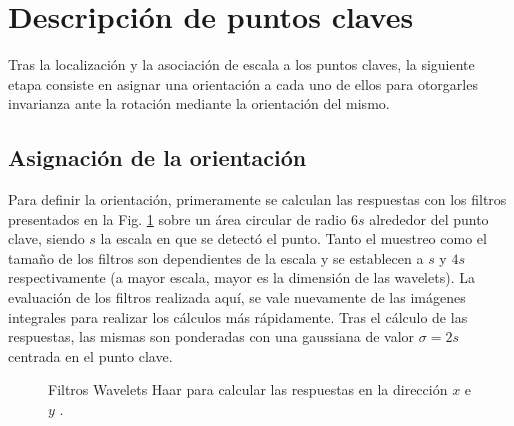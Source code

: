 \section{Descripción de puntos claves}
    \label{sec:descripcion_ptos_claves}
    Tras la localización y la asociación de escala a los puntos claves, la siguiente etapa consiste en asignar una orientación a cada uno de ellos para otorgarles invarianza ante la rotación mediante la orientación del mismo.
%   
  \subsection{Asignación de la orientación}
    \label{sec:orientacion_del_punto}
     Para definir la orientación, primeramente se calculan las respuestas con los filtros presentados en la Fig. \ref{fig:simplekernels} sobre un área circular de radio $6s$ alrededor del punto clave, siendo $s$ la escala en que se detectó el punto. Tanto el muestreo como el tamaño de los filtros son dependientes de la escala y se establecen a $s$ y $4s$ respectivamente (a mayor escala, mayor es la dimensión de las wavelets). %
    La evaluación de los filtros realizada aquí, se vale nuevamente de las imágenes integrales para realizar los cálculos más rápidamente. Tras el cálculo de las respuestas, las mismas son ponderadas con una gaussiana de valor $\sigma=2s$ centrada en el punto clave.  
    \begin{figure}[tbhp]
       \centering
       \hspace{0.1\linewidth}
        \caption[Filtros Wavelets Haar]{Filtros Wavelets Haar para calcular las respuestas en la dirección $x$  e $y$ .}
       \label{fig:simplekernels}                %
    \end{figure}
    
